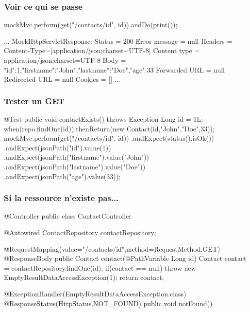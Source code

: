 \begin{frame}[fragile]
 \frametitle{Voir ce qui se passe}
 
 \begin{javacode}
mockMvc.perform(get("/contacts/{id}", id)).andDo(print());
 \end{javacode}
 
 \begin{textcode}
...
MockHttpServletResponse:
          Status = 200
  Error message = null
        Headers = {Content-Type=[application/json;charset=UTF-8]}
   Content type = application/json;charset=UTF-8
           Body = {"id":1,"firstname":"John","lastname":"Doe","age":33}
  Forwarded URL = null
 Redirected URL = null
        Cookies = []
...
 \end{textcode}


\end{frame}

\begin{frame}[fragile]
 \frametitle{Tester un GET}
 
 \begin{javacode}
@Test
public void contactExists() throws Exception {
    Long id = 1L;
    when(repo.findOne(id)).thenReturn(new Contact(id,"John","Doe",33));
    mockMvc.perform(get("/contacts/{id}", id))
         .andExpect(status().isOk())
         .andExpect(jsonPath("id").value(1))
         .andExpect(jsonPath("firstname").value("John"))
         .andExpect(jsonPath("lastname").value("Doe"))
         .andExpect(jsonPath("age").value(33));
}
 \end{javacode}

\end{frame}

\begin{frame}[fragile]
 \frametitle{Si la ressource n'existe pas...}
 
 \begin{javacode}
@Controller
public class ContactController {

  @Autowired ContactRepository contactRepository;

  @RequestMapping(value="/contacts/{id}",method=RequestMethod.GET)
  @ResponseBody
  public Contact contact(@PathVariable Long id) {		
    Contact contact = contactRepository.findOne(id);
    if(contact == null) {
      throw new EmptyResultDataAccessException(1);
    }
    return contact;
  }
  
  @ExceptionHandler(EmptyResultDataAccessException.class)
  @ResponseStatus(HttpStatus.NOT_FOUND)
  public void notFound() { }
  
}
 \end{javacode}

 
\end{frame}

